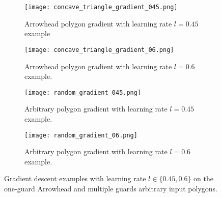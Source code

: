 \begin{figure}[h!]
    \centering
    \begin{subfigure}{0.45\textwidth}
        \centering
        \texttt{[image: concave\_triangle\_gradient\_045.png]}
        \caption{Arrowhead polygon gradient with learning rate $l = 0.45$ example}
        \label{fig:concave_gradient_045}
    \end{subfigure}
    \begin{subfigure}{0.45\textwidth}
        \centering
        \texttt{[image: concave\_triangle\_gradient\_06.png]}
        \caption{Arrowhead polygon gradient with learning rate $l = 0.6$ example.}
        \label{fig:concave_gradient_06}
    \end{subfigure}
    \begin{subfigure}{0.45\textwidth}
        \centering
        \texttt{[image: random\_gradient\_045.png]}
        \caption{Arbitrary polygon gradient with learning rate $l = 0.45$ example.}
        \label{fig:random_gradient_045}
    \end{subfigure}
    \begin{subfigure}{0.45\textwidth}
        \centering
        \texttt{[image: random\_gradient\_06.png]}
        \caption{Arbitrary polygon gradient with learning rate $l = 0.6$ example.}
        \label{fig:random_gradient_06}
    \end{subfigure}
    \caption{Gradient descent examples with learning rate $l \in \{0.45, 0.6\}$ on the one-guard Arrowhead and multiple guards arbitrary input polygons.}
    \label{fig:multiple_gradients}
\end{figure}